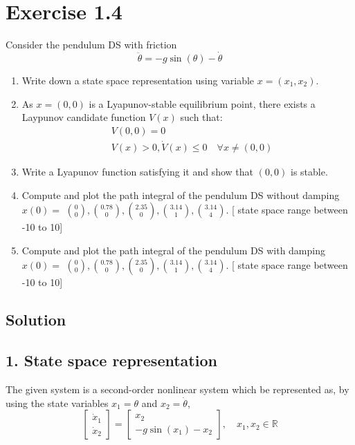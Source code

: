 \section*{Exercise 1.4}

Consider the pendulum DS with friction
\[
    \ddot{\theta}=-g \sin (\theta)-\dot{\theta}
\]
\begin{enumerate}[noitemsep]
    \item Write down a state space representation using variable \( x=\left(x_{1}, x_{2}\right) \).
    \item As \( x=(0,0) \) is a Lyapunov-stable equilibrium point, there exists a Laypunov candidate function \( V(x) \) such that:
          \begin{align*}
               & V(0,0)=0                                            \\
               & V(x)>0, \dot{V}(x) \leq 0 \quad \forall x \neq(0,0)
          \end{align*}
    \item Write a Lyapunov function satisfying it and show that \( (0,0) \) is stable.
    \item Compute and plot the path integral of the pendulum DS without damping \( x(0)= \) \( \binom{0}{0},\binom{0.78}{0},\binom{2.35}{0},\binom{3.14}{1},\binom{3.14}{4} \).
              [ state space range between -10 to 10]
    \item Compute and plot the path integral of the pendulum DS with damping \\
          \( x(0)= \) \( \binom{0}{0},\binom{0.78}{0},\binom{2.35}{0},\binom{3.14}{1},\binom{3.14}{4} \).
              [ state space range between -10 to 10]
\end{enumerate}

\subsection*{Solution}

\subsection*{1. State space representation}

The given system is a second-order nonlinear system which be represented as, by using the state variables \( x_{1} = \theta \) and \( x_{2} = \dot{\theta} \),
\[
    \boxed{
        \begin{bmatrix}
            \dot{x}_{1} \\
            \dot{x}_{2}
        \end{bmatrix}
        =
        \begin{bmatrix}
            x_{2} \\
            -g \sin (x_{1}) - x_{2}
        \end{bmatrix}
        ,\quad x_{1}, x_{2} \in \mathbb{R}
    }
\]
